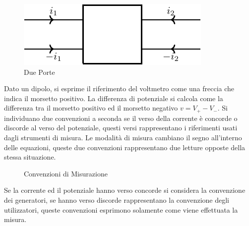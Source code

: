 \documentclass{article}
\numberwithin{equation}{subsection}
\begin{document}
\begin{figure}[H]%
    \centering
    \includegraphics{due-porte.pdf}
    \caption{Due Porte}
    \label{fig:due-porte-1}
\end{figure}

Dato un dipolo, si esprime il riferimento del voltmetro come una freccia che indica il morsetto positivo. La differenza di potenziale si calcola come la differenza tra il 
morsetto positivo ed il morsetto negativo $v=V_+-V_-$. Si individuano due convenzioni a seconda se il verso della corrente è concorde o discorde al verso del potenziale, questi 
versi rappresentano i riferimenti usati dagli strumenti di misura. Le modalità di misura cambiano il segno all'interno delle equazioni, queste due convenzioni rappresentano 
due letture opposte della stessa situazione. 

\begin{figure}[H]%
    \centering
    \qquad
    \caption{Convenzioni di Misurazione}
    \label{fig:convenzioni-misurazione}
\end{figure}

Se la corrente ed il potenziale hanno verso concorde si considera la convenzione dei generatori, se hanno verso discorde rappresentano la convenzione degli utilizzatori, 
queste convenzioni esprimono solamente come viene effettuata la misura. 
\end{document}
